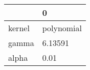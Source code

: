 \begin{tabular}{ll}
\toprule
{} &           0 \\
\midrule
kernel &  polynomial \\
gamma  &     6.13591 \\
alpha  &        0.01 \\
\bottomrule
\end{tabular}
